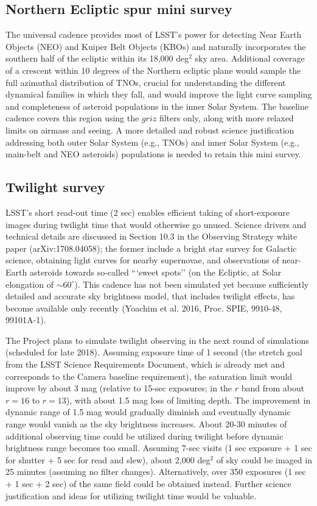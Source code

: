 \documentclass[DM,lsstdraft,toc,usenatbib]{lsstdoc}
\begin{document}
\subsection{Northern Ecliptic spur mini survey}

The universal cadence provides most of LSST’s power for detecting Near Earth Objects (NEO) and 
Kuiper Belt Objects (KBOs) and naturally incorporates the southern half of the ecliptic within its 
18,000 deg$^2$ sky area. Additional coverage of a crescent within 10 degrees of the Northern ecliptic 
plane would sample the full azimuthal distribution of TNOs, crucial for understanding the different 
dynamical families in which they fall, and would improve the light curve sampling and completeness
of asteroid populations in the inner Solar System. The baseline cadence covers this region using the 
$griz$ filters only, along with more relaxed limits on airmass and seeing. A more detailed 
and robust science justification addressing both outer Solar System (e.g., TNOs) and inner Solar
System (e.g., main-belt and NEO asteroids) populations is needed to retain this mini survey. 



\subsection{Twilight survey \label{sec:twilight}} 

LSST's short read-out time (2 sec) enables efficient taking of short-exposure images during twilight time 
that would otherwise go unused. Science drivers and technical details are discussed in Section 10.3 in the 
Observing Strategy white paper (arXiv:1708.04058); the former include a bright star survey for Galactic
science, obtaining light curves for nearby supernovae, and observations of near-Earth asteroids towards
so-called ```sweet spots'' (on the Ecliptic, at Solar elongation of $\sim60^\circ$). This cadence has not 
been simulated yet because sufficiently detailed and accurate sky brightness model, that includes twilight 
effects, has become available only recently (Yoachim et al. 2016, Proc. SPIE, 9910-48, 99101A-1). 

The Project plans to simulate twilight observing in the next round of simulations (scheduled for late 2018). 
Assuming exposure time of 1 second (the stretch goal from the LSST Science Requirements Document, 
which is already met and corresponds to the Camera baseline requirement), the saturation limit would 
improve by about 3 mag (relative to 15-sec exposures; in the $r$ band from about $r=16$ to $r=13$),
with about 1.5 mag loss of limiting depth. The improvement in dynamic range of 1.5 mag would gradually
diminish and eventually dynamic range would vanish as the sky brightness increases. About 20-30 minutes
of additional observing time could be utilized during twilight before dynamic brightness range becomes
too small. Assuming 7-sec visits (1 sec exposure + 1 sec for shutter + 5 sec for read and slew), about 
2,000 deg$^2$ of sky could be imaged in 25 minutes (assuming no filter changes). Alternatively, over 
350 exposures (1 sec + 1 sec + 2 sec) of the same field could be obtained instead. Further science 
justification and ideas for utilizing twilight time would be valuable. 
\end{document}
